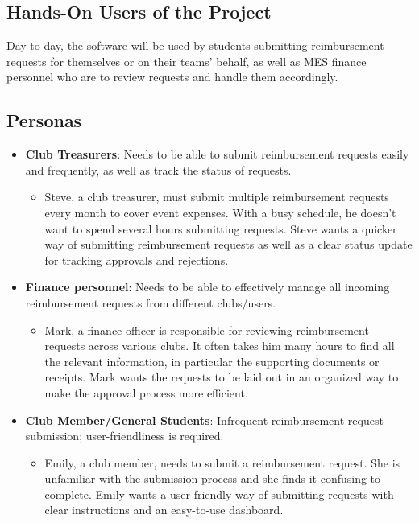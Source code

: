 \documentclass[12pt]{article}
\begin{document}
\subsection{Hands-On Users of the Project}
Day to day, the software will be used by students submitting reimbursement requests for themselves or on their teams' behalf, as well as MES finance personnel who are to review requests and handle them accordingly.

\subsection{Personas}
\begin{itemize}
    \item \textbf{Club Treasurers}: Needs to be able to submit reimbursement requests easily and frequently, as well as track the status of requests.
    \begin{itemize}
        \item Steve, a club treasurer, must submit multiple reimbursement requests every month to cover event expenses. With a busy schedule, he doesn't want to spend several hours submitting requests. Steve wants a quicker way of submitting reimbursement requests as well as a clear status update for tracking approvals and rejections.
    \end{itemize}
    \item \textbf{Finance personnel}: Needs to be able to effectively manage all incoming reimbursement requests from different clubs/users.
    \begin{itemize}
        \item Mark, a finance officer is responsible for reviewing reimbursement requests across various clubs. It often takes him many hours to find all the relevant information, in particular the supporting documents or receipts. Mark wants the requests to be laid out in an organized way to make the approval process more efficient.
    \end{itemize}
    \item \textbf{Club Member/General Students}: Infrequent reimbursement request submission; user-friendliness is required.
    \begin{itemize}
        \item Emily, a club member, needs to submit a reimbursement request. She is unfamiliar with the submission process and she finds it confusing to complete. Emily wants a user-friendly way of submitting requests with clear instructions and an easy-to-use dashboard.
    \end{itemize}

\end{itemize}
\end{document}

